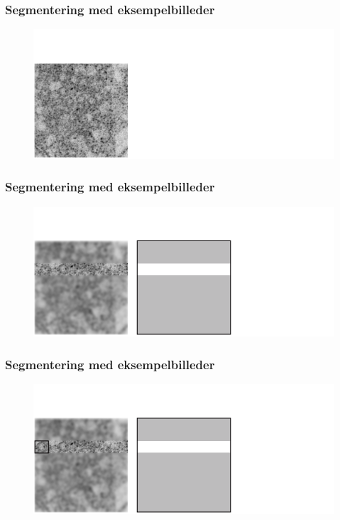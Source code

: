 \documentclass[12pt,t]{beamer}
\begin{document}


\begin{frame}
\frametitle{Segmentering med eksempelbilleder}
\begin{figure}[H]
\includegraphics[scale=0.35]{img/afstand/3.png}
\end{figure}
\end{frame}

\begin{frame}
\frametitle{Segmentering med eksempelbilleder}
\begin{figure}[H]
\includegraphics[scale=0.35]{img/afstand/4.png}
\end{figure}
\end{frame}

\begin{frame}
\frametitle{Segmentering med eksempelbilleder}
\begin{figure}[H]
\includegraphics[scale=0.35]{img/afstand/5.png}
\end{figure}
\end{frame}
\end{document}
